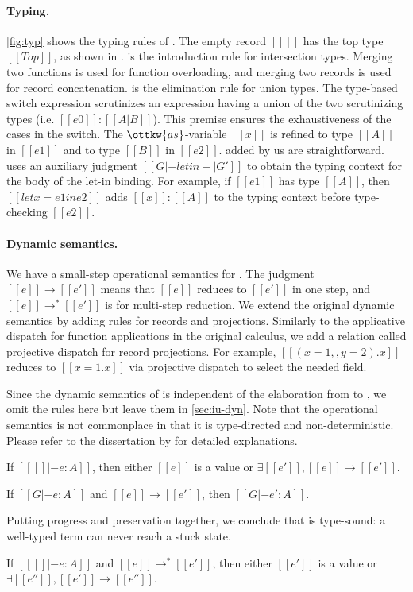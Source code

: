 \paragraph{Typing.}
\autoref{fig:typ} shows the typing rules of \lambdaiu. The empty record $[[{}]]$
has the top type $[[Top]]$, as shown in .  is the
introduction rule for intersection types. Merging two functions is used for
function overloading, and merging two records is used for record concatenation.
 is the elimination rule for union types. The type-based switch
expression scrutinizes an expression having a union of the two scrutinizing
types (i.e. $[[e0]]:[[A|B]]$). This premise ensures the exhaustiveness of the
cases in the switch. The $\ottkw{as}$-variable $[[x]]$ is refined to type
$[[A]]$ in $[[e1]]$ and to type $[[B]]$ in $[[e2]]$.
 added by us are straightforward. 
uses an auxiliary judgment $[[G |- letin -| G']]$ to obtain the typing context
for the body of the let-in binding. For example, if $[[e1]]$ has type $[[A]]$,
then $[[let x = e1 in e2]]$ adds $[[x]]:[[A]]$ to the typing context before
type-checking $[[e2]]$.

\paragraph{Dynamic semantics.}
We have a small-step operational semantics for \lambdaiu. The judgment
$[[e]]\longrightarrow[[e']]$ means that $[[e]]$ reduces to $[[e']]$ in one step,
and $[[e]]\longrightarrow^*[[e']]$ is for multi-step reduction. We extend the
original dynamic semantics by adding rules for records and projections.
Similarly to the applicative dispatch for function applications in the original
calculus, we add a relation called projective dispatch for record projections.
For example, $[[({x = 1},,{y = 2}).x]]$ reduces to $[[{x = 1}.x]]$ via
projective dispatch to select the needed field.

Since the dynamic semantics of \lambdaiu is independent of the elaboration from
\uaena to \lambdaiu, we omit the rules here but leave them in
\autoref{sec:iu-dyn}. Note that the operational semantics is not commonplace in
that it is type-directed and non-deterministic. Please refer to the dissertation
by \citet{rehman2023blend} for detailed explanations.

\begin{theorem}[Progress]
  If $[[ [] |- e : A]]$, then either $[[e]]$ is a value or $\exists [[e']], [[e]] \longrightarrow [[e']]$.
\end{theorem}
\begin{theorem}[Preservation]
  If $[[G |- e : A]]$ and $[[e]] \longrightarrow [[e']]$, then $[[G |- e' : A]]$.
\end{theorem}
Putting progress and preservation together, we conclude that \lambdaiu is type-sound:
a well-typed term can never reach a stuck state.
\begin{corollary}
  If $[[ [] |- e : A]]$ and $[[e]] \longrightarrow^* [[e']]$, then either $[[e']]$ is a value or $\exists [[e'']], [[e']] \longrightarrow [[e'']]$.
\end{corollary}

